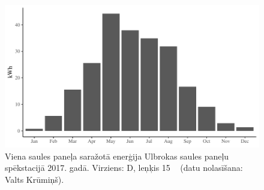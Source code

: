 \begin{figure}[h]
  \centering
  \includegraphics[width=\linewidth]{figures/misc/ulbroka1.pdf}
  \caption{Viena saules paneļa saražotā enerģija Ulbrokas saules paneļu spēkstacijā 2017. gadā. Virziens: D, leņķis 15 \textdegree ~\cite{fronius} (datu nolasīšana: Valts Krūmiņš).}
  \label{fig:ulbroka}
\end{figure}
